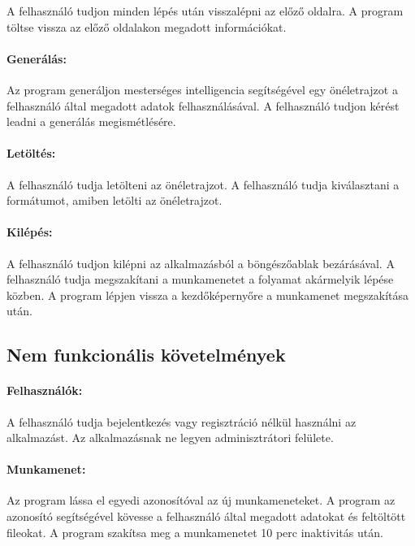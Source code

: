 A felhasználó tudjon minden lépés után visszalépni az előző oldalra.
A program töltse vissza az előző oldalakon megadott információkat.

\paragraph{Generálás:}

Az program generáljon mesterséges intelligencia segítségével egy önéletrajzot a felhasználó által megadott adatok felhasználásával. A felhasználó tudjon kérést leadni a generálás megismétlésére.

\paragraph{Letöltés:}

A felhasználó tudja letölteni az önéletrajzot. A felhasználó tudja kiválasztani a formátumot, amiben letölti az önéletrajzot.

\paragraph{Kilépés:}

A felhasználó tudjon kilépni az alkalmazásból a böngészőablak bezárásával. A felhasználó tudja megszakítani a munkamenetet a folyamat akármelyik lépése közben. A program lépjen vissza a kezdőképernyőre a munkamenet megszakítása után.

\subsection{Nem funkcionális követelmények}

\paragraph{Felhasználók:}

A felhasználó tudja bejelentkezés vagy regisztráció nélkül használni az alkalmazást. Az alkalmazásnak ne legyen adminisztrátori felülete.

\paragraph{Munkamenet:}

Az program lássa el egyedi azonosítóval az új munkameneteket. A program az azonosító segítségével kövesse a felhasználó által megadott adatokat és feltöltött fileokat. A program szakítsa meg a munkamenetet 10 perc inaktivitás után.

